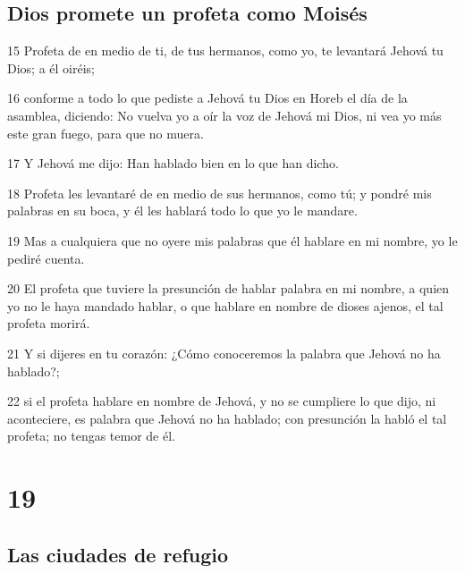 \section{Dios promete un profeta como Moisés}

\par 15 Profeta de en medio de ti, de tus hermanos, como yo, te levantará Jehová tu Dios; a él oiréis;
\par 16 conforme a todo lo que pediste a Jehová tu Dios en Horeb el día de la asamblea, diciendo: No vuelva yo a oír la voz de Jehová mi Dios, ni vea yo más este gran fuego, para que no muera.
\par 17 Y Jehová me dijo: Han hablado bien en lo que han dicho.
\par 18 Profeta les levantaré de en medio de sus hermanos, como tú; y pondré mis palabras en su boca, y él les hablará todo lo que yo le mandare.
\par 19 Mas a cualquiera que no oyere mis palabras que él hablare en mi nombre, yo le pediré cuenta. 
\par 20 El profeta que tuviere la presunción de hablar palabra en mi nombre, a quien yo no le haya mandado hablar, o que hablare en nombre de dioses ajenos, el tal profeta morirá.
\par 21 Y si dijeres en tu corazón: ¿Cómo conoceremos la palabra que Jehová no ha hablado?;
\par 22 si el profeta hablare en nombre de Jehová, y no se cumpliere lo que dijo, ni aconteciere, es palabra que Jehová no ha hablado; con presunción la habló el tal profeta; no tengas temor de él.

\chapter{19}

\section{Las ciudades de refugio}

